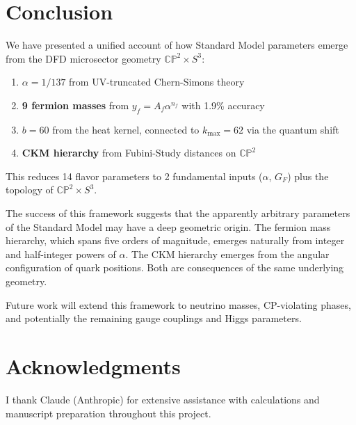 \documentclass[11pt,a4paper]{article}
\newcommand{\CP}{\mathbb{CP}}
\begin{document}
\section{Conclusion}

We have presented a unified account of how Standard Model parameters emerge from the DFD microsector geometry $\CP^2 \times S^3$:

\begin{enumerate}
\item \textbf{$\alpha = 1/137$} from UV-truncated Chern-Simons theory
\item \textbf{9 fermion masses} from $y_f = A_f \alpha^{n_f}$ with 1.9\% accuracy
\item \textbf{$b = 60$} from the heat kernel, connected to $k_{\max} = 62$ via the quantum shift
\item \textbf{CKM hierarchy} from Fubini-Study distances on $\CP^2$
\end{enumerate}

This reduces 14 flavor parameters to 2 fundamental inputs ($\alpha$, $G_F$) plus the topology of $\CP^2 \times S^3$.

The success of this framework suggests that the apparently arbitrary parameters of the Standard Model may have a deep geometric origin. The fermion mass hierarchy, which spans five orders of magnitude, emerges naturally from integer and half-integer powers of $\alpha$. The CKM hierarchy emerges from the angular configuration of quark positions. Both are consequences of the same underlying geometry.

Future work will extend this framework to neutrino masses, CP-violating phases, and potentially the remaining gauge couplings and Higgs parameters.

\section*{Acknowledgments}

I thank Claude (Anthropic) for extensive assistance with calculations and manuscript preparation throughout this project.
\end{document}
